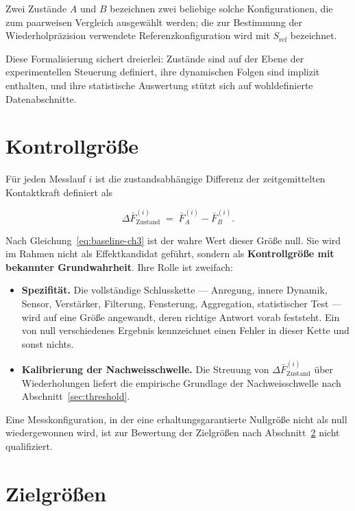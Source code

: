 \documentclass[12pt,a4paper]{report}
\begin{document}
Zwei Zustände $A$ und $B$ bezeichnen zwei beliebige solche
Konfigurationen, die zum paarweisen Vergleich ausgewählt werden; die zur
Bestimmung der Wiederholpräzision verwendete Referenzkonfiguration wird
mit $S_{\mathrm{ref}}$ bezeichnet.

Diese Formalisierung sichert dreierlei: Zustände sind auf der Ebene der
experimentellen Steuerung definiert, ihre dynamischen Folgen sind
implizit enthalten, und ihre statistische Auswertung stützt sich auf
wohldefinierte Datenabschnitte.

\section{Kontrollgröße}

Für jeden Messlauf $i$ ist die zustandsabhängige Differenz der
zeitgemittelten Kontaktkraft definiert als

\begin{equation}
  \Delta \bar{F}^{(i)}_{\mathrm{Zustand}}
  \;=\; \bar{F}^{(i)}_{A} - \bar{F}^{(i)}_{B}.
  \label{eq:control-quantity}
\end{equation}

Nach Gleichung~\eqref{eq:baseline-ch3} ist der wahre Wert dieser Größe
null. Sie wird im Rahmen nicht als Effektkandidat geführt, sondern als
\textbf{Kontrollgröße mit bekannter Grundwahrheit}. Ihre Rolle ist
zweifach:

\begin{itemize}
  \item \textbf{Spezifität.} Die vollständige Schlusskette --- Anregung,
        innere Dynamik, Sensor, Verstärker, Filterung, Fensterung,
        Aggregation, statistischer Test --- wird auf eine Größe
        angewandt, deren richtige Antwort vorab feststeht. Ein von null
        verschiedenes Ergebnis kennzeichnet einen Fehler in dieser Kette
        und sonst nichts.
  \item \textbf{Kalibrierung der Nachweisschwelle.} Die Streuung von
        $\Delta \bar{F}^{(i)}_{\mathrm{Zustand}}$ über Wiederholungen
        liefert die empirische Grundlage der Nachweisschwelle nach
        Abschnitt~\ref{sec:threshold}.
\end{itemize}

Eine Messkonfiguration, in der eine erhaltungsgarantierte Nullgröße nicht
als null wiedergewonnen wird, ist zur Bewertung der Zielgrößen nach
Abschnitt~\ref{sec:target-quantities} nicht qualifiziert.

\section{Zielgrößen}
\label{sec:target-quantities}
\end{document}
